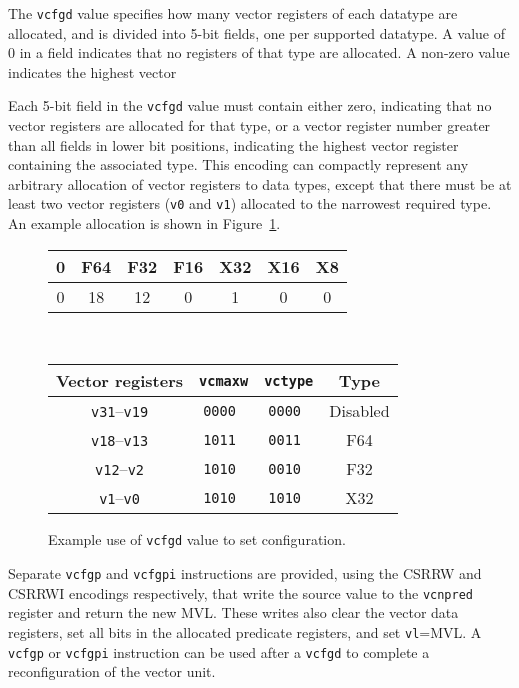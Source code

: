 The {\tt vcfgd} value specifies how many vector registers of each
datatype are allocated, and is divided into 5-bit fields, one per
supported datatype.  A value of 0 in a field indicates that no
registers of that type are allocated.  A non-zero value indicates the
highest vector

Each 5-bit field in the {\tt vcfgd} value must contain either zero,
indicating that no vector registers are allocated for that type, or a
vector register number greater than all fields in lower bit positions,
indicating the highest vector register containing the associated type.
This encoding can compactly represent any arbitrary allocation of
vector registers to data types, except that there must be at least two
vector registers ({\tt v0} and {\tt v1}) allocated to the narrowest
required type. An example allocation is shown in
Figure~\ref{fig:vcfgdexample}.

\begin{figure}
  \centering
  \begin{tabular}{|c|c|c|c|c|c|c|}
    \hline
     0 & F64 & F32 & F16 & X32 & X16 & X8 \\
     \hline
     \hline
     0 & 18  & 12  & 0   &  1  &  0  & 0  \\
    \hline
  \end{tabular}
  \\
  \vspace{0.1in}
  \begin{tabular}{|c|c|c|c|}
    \hline
    Vector registers & {\tt vcmaxw} & {\tt vctype} & Type \\
    \hline
    {\tt v31}--{\tt v19} & \tt 0000     & \tt 0000 & Disabled \\
    {\tt v18}--{\tt v13} & \tt 1011     & \tt 0011 & F64 \\
    {\tt v12}--{\tt v2}  & \tt 1010     & \tt 0010 & F32 \\
    {\tt v1}--{\tt v0}   & \tt 1010     & \tt 1010 & X32 \\
    \hline
  \end{tabular}
  \caption{Example use of {\tt vcfgd} value to set configuration.}
  \label{fig:vcfgdexample}
\end{figure}

Separate {\tt vcfgp} and {\tt vcfgpi} instructions are provided, using
the CSRRW and CSRRWI encodings respectively, that write the source
value to the {\tt vcnpred} register and return the new MVL.  These
writes also clear the vector data registers, set all bits in the
allocated predicate registers, and set {\tt vl}=MVL. A {\tt vcfgp} or
{\tt vcfgpi} instruction can be used after a {\tt vcfgd} to complete a
reconfiguration of the vector unit.

